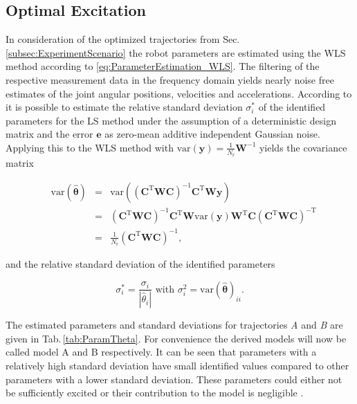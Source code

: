 
\subsection{Optimal Excitation}
\label{subsec:OptimalExcitation_Result}


In consideration of the optimized trajectories from Sec.\,\ref{subsec:ExperimentScenario} the robot parameters are estimated using the WLS method according to \eqref{eq:ParameterEstimation_WLS}. The filtering of the respective measurement data in the frequency domain yields nearly noise free estimates of the joint angular positions, velocities and accelerations. According to \cite{Khalil.2006} it is possible to estimate the relative standard deviation $\sigma_{i}^*$ of the identified parameters for the LS method under the assumption of a deterministic design matrix and the error $\boldsymbol{e}$ as zero-mean additive independent Gaussian noise. Applying this to the WLS method with $\mathrm{var}(\boldsymbol{y}) = \frac{1}{N_\text{r}} \boldsymbol{W}^{-1}$ yields the covariance matrix

\begin{equation}\label{eq:ParaVar}
	\begin{aligned}
&	\mathrm{var}(\hat{\boldsymbol{\theta}}) &= {}& \mathrm{var}((\boldsymbol{C}^\mathrm{T} \boldsymbol{W} \boldsymbol{C})^{-1} \boldsymbol{C}^\mathrm{T} \boldsymbol{W} \boldsymbol{y}) \\
&								&= {}& (\boldsymbol{C}^\mathrm{T} \boldsymbol{W} \boldsymbol{C})^{-1} \boldsymbol{C}^\mathrm{T} \boldsymbol{W} \mathrm{var}(\boldsymbol{y}) \boldsymbol{W}^\mathrm{T} \boldsymbol{C} (\boldsymbol{C}^\mathrm{T} \boldsymbol{W} \boldsymbol{C})^{-\mathrm{T}} \\
&								&= {}& \frac{1}{N_\text{r}}(\boldsymbol{C}^\mathrm{T} \boldsymbol{W} \boldsymbol{C})^{-1},
	\end{aligned}
\end{equation}

and the relative standard deviation of the identified parameters

\begin{equation}\label{eq:ParaVar_rel}
	\sigma_{i}^* = \frac{\sigma_{i}}{\left| \hat{\theta}_i \right|} \text{ with } \sigma_{i}^2 = \mathrm{var}(\hat{\boldsymbol{\theta}})_{ii}.
\end{equation}

The estimated parameters and standard deviations for trajectories \textit{A} and \textit{B} are given in Tab.\,\ref{tab:ParamTheta}. For convenience the derived models will now be called model A and B respectively. It can be seen that parameters with a relatively high standard deviation have small identified values compared to other parameters with a lower standard deviation. These parameters could either not be sufficiently excited or their contribution to the model is negligible \cite{Khalil.2006}.

